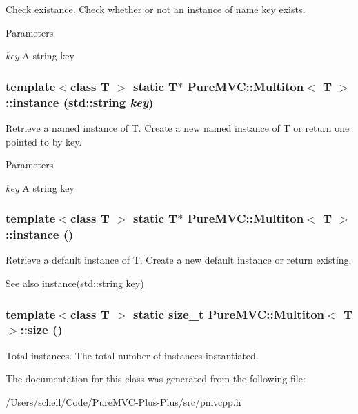 Check existance. Check whether or not an instance of name key exists. 
\begin{DoxyParams}{Parameters}
\item[{\em key}]A string key \end{DoxyParams}
\hypertarget{class_pure_m_v_c_1_1_multiton_a88e3c54b909fee66fef39ccf524377df}{
\subsubsection[{instance}]{\setlength{\rightskip}{0pt plus 5cm}template$<$class T $>$ static T$\ast$ {\bf PureMVC::Multiton}$<$ T $>$::instance (std::string {\em key})}}
\label{class_pure_m_v_c_1_1_multiton_a88e3c54b909fee66fef39ccf524377df}


Retrieve a named instance of T. Create a new named instance of T or return one pointed to by key. 
\begin{DoxyParams}{Parameters}
\item[{\em key}]A string key \end{DoxyParams}
\hypertarget{class_pure_m_v_c_1_1_multiton_aea411a3852c095542ec025b14f536f12}{
\subsubsection[{instance}]{\setlength{\rightskip}{0pt plus 5cm}template$<$class T $>$ static T$\ast$ {\bf PureMVC::Multiton}$<$ T $>$::instance ()}}
\label{class_pure_m_v_c_1_1_multiton_aea411a3852c095542ec025b14f536f12}


Retrieve a default instance of T. Create a new default instance or return existing. \begin{DoxySeeAlso}{See also}
\hyperlink{class_pure_m_v_c_1_1_multiton_a88e3c54b909fee66fef39ccf524377df}{instance(std::string key)} 
\end{DoxySeeAlso}
\hypertarget{class_pure_m_v_c_1_1_multiton_a8e6b1a6f3c6bf4751c234d3854a6bf93}{
\subsubsection[{size}]{\setlength{\rightskip}{0pt plus 5cm}template$<$class T $>$ static size\_\-t {\bf PureMVC::Multiton}$<$ T $>$::size ()}}
\label{class_pure_m_v_c_1_1_multiton_a8e6b1a6f3c6bf4751c234d3854a6bf93}


Total instances. The total number of instances instantiated. 

The documentation for this class was generated from the following file:\begin{DoxyCompactItemize}
\item 
/Users/schell/Code/PureMVC-\/Plus-\/Plus/src/pmvcpp.h\end{DoxyCompactItemize}
